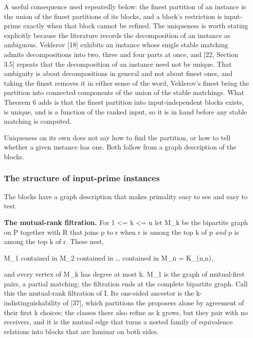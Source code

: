 \documentclass[
  11pt,
]{article}
\begin{document}
A useful consequence used repeatedly below: the finest partition of an
instance is the union of the finest partitions of its blocks, and a
block's restriction is input-prime exactly when that block cannot be
refined. The uniqueness is worth stating explicitly because the
literature records the decomposition of an instance as ambiguous.
Veklerov {[}18{]} exhibits an instance whose single stable matching
admits decompositions into two, three and four parts at once, and {[}22,
Section 3.5{]} repeats that the decomposition of an instance need not be
unique. That ambiguity is about decompositions in general and not about
finest ones, and taking the finest removes it in either sense of the
word, Veklerov's finest being the partition into connected components of
the union of the stable matchings. What Theorem 6 adds is that the
finest partition into input-independent blocks exists, is unique, and is
a function of the ranked input, so it is in hand before any stable
matching is computed.

Uniqueness on its own does not say how to find the partition, or how to
tell whether a given instance has one. Both follow from a graph
description of the blocks.

\hypertarget{the-structure-of-input-prime-instances}{%
\subsubsection{The structure of input-prime
instances}\label{the-structure-of-input-prime-instances}}

The blocks have a graph description that makes primality easy to see and
easy to test.

\textbf{The mutual-rank filtration.} For 1 \textless= k \textless= n let
M\_k be the bipartite graph on P together with R that joins p to r when
r is among the top k of p \emph{and} p is among the top k of r. These
nest,

M\_1 contained in M\_2 contained in \ldots{} contained in M\_n =
K\_(n,n),

and every vertex of M\_k has degree at most k. M\_1 is the graph of
mutual-first pairs, a partial matching; the filtration ends at the
complete bipartite graph. Call this the mutual-rank filtration of I. Its
one-sided ancestor is the k-indistinguishability of {[}37{]}, which
partitions the proposers alone by agreement of their first k choices;
the classes there also refine as k grows, but they pair with no
receivers, and it is the mutual edge that turns a nested family of
equivalence relations into blocks that are laminar on both sides.
\end{document}
